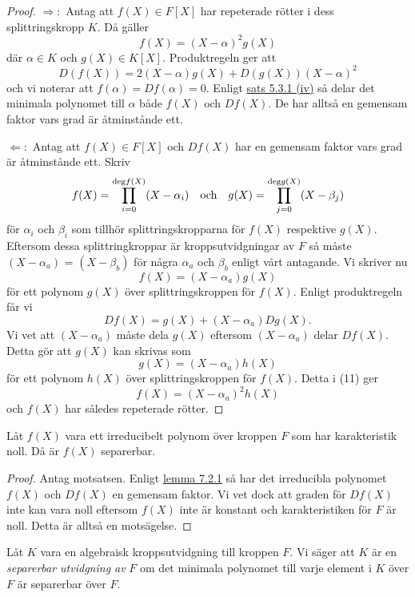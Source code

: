 \documentclass{article}
\newcommand{\grad}[0]{\textnormal{deg}}
\theoremstyle{definition}
\begin{document}
\begin{proof}
  $\Rightarrow:$ Antag att $f(X) \in F[X]$ har repeterade rötter i dess splittringskropp $K$. Då gäller 
  \[f(X) = (X-\alpha)^2 g(X)\]
  där $\alpha \in K$ och $g(X) \in K[X].$ Produktregeln ger att 
  \[D(f(X)) = 2(X- \alpha) g(X) + D(g(X)) (X - \alpha)^2\]
  och vi noterar att $f(\alpha) = Df(\alpha) = 0.$ Enligt \hyperlink{minpol}{sats 5.3.1 (iv)} så delar det minimala polynomet till $\alpha$ både 
  $f(X)$ och $Df(X)$. De har alltså en gemensam faktor vars grad är åtminstånde ett. 

  $\Leftarrow:$ Antag att $f(X) \in F[X]$ och $Df(X)$ har en gemensam faktor vars grad är åtminstånde ett. 
  Skriv 
  \[f(X) = \prod_{i = 0}^{\grad f(X)} (X-\alpha_i) \quad \textnormal{och} \quad g(X) = \prod_{j = 0}^{\grad g(X)} (X-\beta_j)\]
  för $\alpha_i$ och $\beta_i$ som tillhör splittringskropparna för $f(X)$ respektive $g(X)$. Eftersom dessa 
  splittringkroppar är kroppsutvidgningar av $F$ så måste $(X - \alpha_a)$ = $(X - \beta_b)$ för några $\alpha_a$ och $\beta_b$ enligt vårt antagande. 
  Vi skriver nu 
  \begin{equation}
    f(X) = (X-\alpha_a)g(X)
  \end{equation}
  för ett polynom $g(X)$ över splittringskroppen för $f(X)$. Enligt produktregeln får vi 
  \[Df(X) = g(X) + (X - \alpha_a)Dg(X).\]
  Vi vet att $(X - \alpha_a)$ måste dela $g(X)$ eftersom $(X - \alpha_a)$ delar $Df(X)$. Detta gör att $g(X)$ kan skrivas som
  \[g(X) = (X - \alpha_a)h(X)\]
  för ett polynom $h(X)$ över splittringskroppen för $f(X)$. Detta i (11) ger 
  \[f(X) = (X - \alpha_a)^2h(X)\]
  och $f(X)$ har således repeterade rötter.
\end{proof}

\begin{myprop}{}{}
  Låt $f(X)$ vara ett irreducibelt polynom över kroppen $F$ som har karakteristik noll. Då är $f(X)$ separerbar. 
\end{myprop}

\begin{proof}
  Antag motsatsen. Enligt \hyperlink{lemma7.2.1}{lemma 7.2.1} så har det irreducibla polynomet $f(X)$ och $Df(X)$ en gemensam faktor. 
  Vi vet dock att graden för $Df(X)$ inte kan vara noll eftersom $f(X)$ inte är konstant och karakteristiken för $F$ är noll. Detta är alltså 
  en motsägelse.
\end{proof}

\begin{mydef}{}{}
  Låt $K$ vara en algebraisk kroppsutvidgning till kroppen $F$. Vi säger att $K$ är en \textit{separerbar utvidgning av} $F$ om 
  det minimala polynomet till varje element i $K$ över $F$ är separerbar över $F$. 
\end{mydef}
\end{document}
